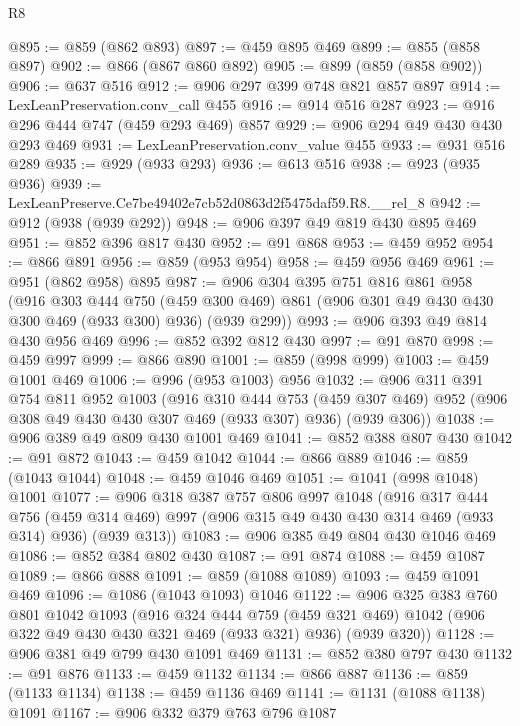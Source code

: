 \begin{lexlean}{R8}
\begin{coremodule}
@895 := @859 (@862 @893)
@897 := @459 @895 @469
@899 := @855 (@858 @897)
@902 := @866 (@867 @860 @892)
@905 := @899 (@859 (@858 @902))
@906 := @637 @516
@912 := @906 @297 @399 @748 @821 @857 @897
@914 := LexLeanPreservation.conv_call @455
@916 := @914 @516 @287
@923 := @916 @296 @444 @747 (@459 @293 @469) @857
@929 := @906 @294 @49 @430 @430 @293 @469
@931 := LexLeanPreservation.conv_value @455
@933 := @931 @516 @289
@935 := @929 (@933 @293)
@936 := @613 @516
@938 := @923 (@935 @936)
@939 := LexLeanPreserve.Ce7be49402e7cb52d0863d2f5475daf59.R8.__rel_8
@942 := @912 (@938 (@939 @292))
@948 := @906 @397 @49 @819 @430 @895 @469
@951 := @852 @396 @817 @430
@952 := @91 @868
@953 := @459 @952
@954 := @866 @891
@956 := @859 (@953 @954)
@958 := @459 @956 @469
@961 := @951 (@862 @958) @895
@987 := @906
    @304
    @395
    @751
    @816
    @861
    @958
    (@916
      @303
      @444
      @750
      (@459 @300 @469)
      @861
      (@906 @301 @49 @430 @430 @300 @469 (@933 @300) @936)
      (@939 @299))
@993 := @906 @393 @49 @814 @430 @956 @469
@996 := @852 @392 @812 @430
@997 := @91 @870
@998 := @459 @997
@999 := @866 @890
@1001 := @859 (@998 @999)
@1003 := @459 @1001 @469
@1006 := @996 (@953 @1003) @956
@1032 := @906
    @311
    @391
    @754
    @811
    @952
    @1003
    (@916
      @310
      @444
      @753
      (@459 @307 @469)
      @952
      (@906 @308 @49 @430 @430 @307 @469 (@933 @307) @936)
      (@939 @306))
@1038 := @906 @389 @49 @809 @430 @1001 @469
@1041 := @852 @388 @807 @430
@1042 := @91 @872
@1043 := @459 @1042
@1044 := @866 @889
@1046 := @859 (@1043 @1044)
@1048 := @459 @1046 @469
@1051 := @1041 (@998 @1048) @1001
@1077 := @906
    @318
    @387
    @757
    @806
    @997
    @1048
    (@916
      @317
      @444
      @756
      (@459 @314 @469)
      @997
      (@906 @315 @49 @430 @430 @314 @469 (@933 @314) @936)
      (@939 @313))
@1083 := @906 @385 @49 @804 @430 @1046 @469
@1086 := @852 @384 @802 @430
@1087 := @91 @874
@1088 := @459 @1087
@1089 := @866 @888
@1091 := @859 (@1088 @1089)
@1093 := @459 @1091 @469
@1096 := @1086 (@1043 @1093) @1046
@1122 := @906
    @325
    @383
    @760
    @801
    @1042
    @1093
    (@916
      @324
      @444
      @759
      (@459 @321 @469)
      @1042
      (@906 @322 @49 @430 @430 @321 @469 (@933 @321) @936)
      (@939 @320))
@1128 := @906 @381 @49 @799 @430 @1091 @469
@1131 := @852 @380 @797 @430
@1132 := @91 @876
@1133 := @459 @1132
@1134 := @866 @887
@1136 := @859 (@1133 @1134)
@1138 := @459 @1136 @469
@1141 := @1131 (@1088 @1138) @1091
@1167 := @906
    @332
    @379
    @763
    @796
    @1087

\end{coremodule}
\end{lexlean}
